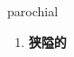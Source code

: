
\begin{frame}
{\huge parochial}
\begin{center}
\begin{enumerate}\Large
  \item \textbf{狭隘的}
\end{enumerate}
\end{center}
\end{frame}
